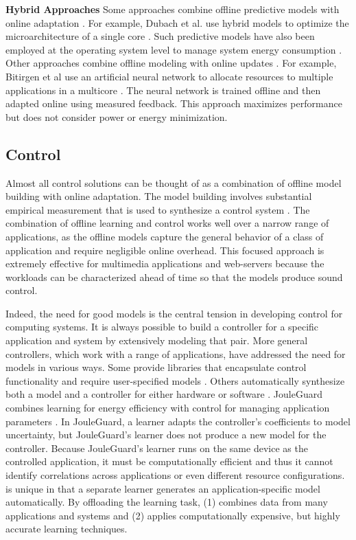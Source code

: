 \noindent \textbf{Hybrid Approaches} Some approaches combine offline
predictive models with online adaptation
\cite{Zhang2012,packandcap,Winter2010,dubach2010,Koala,Cinder,
  wu2012inferred}.  For example, Dubach et al.  use hybrid models to
optimize the microarchitecture of a single core \cite{dubach2010}.
Such predictive models have also been employed at the operating system
level to manage system energy consumption
\cite{Koala,Cinder,wu2012inferred}.  Other approaches combine offline
modeling with online updates \cite{JouleGuard,Bitirgen2008,Ipek}.  For
example, Bitirgen et al use an artificial neural network to allocate
resources to multiple applications in a multicore \cite{Bitirgen2008}.
The neural network is trained offline and then adapted online using
measured feedback.  This approach maximizes performance but does not
consider power or energy minimization.

\subsection{Control}
Almost all control solutions can be thought of as a combination of
offline model building with online adaptation.  The model building
involves substantial empirical measurement that is used to synthesize
a control system
\cite{Wu2004,TCST,Chen2011,PTRADE,POET,ControlWare,Agilos,Rajkumar,Sojka,Raghavendra2008}.
The combination of offline learning and control works well over a
narrow range of applications, as the offline models capture the
general behavior of a class of application and require negligible
online overhead.  This focused approach is extremely effective for
multimedia applications \cite{grace2,flinn99,flinn2004,xtune,TCST} and
web-servers \cite{Horvarth,LuEtAl-2006a,SunDaiPan-2008a} because the
workloads can be characterized ahead of time so that the models
produce sound control.

Indeed, the need for good models is the central tension in developing
control for computing systems.  It is always possible to build a
controller for a specific application and system by extensively
modeling that pair.  More general controllers, which work with a range
of applications, have addressed the need for models in various ways.
Some provide libraries that encapsulate control functionality and
require user-specified models
\cite{ControlWare,Sojka,Rajkumar,POET,SWiFT}.  Others automatically
synthesize both a model and a controller for either hardware
\cite{josep-isca2016} or software \cite{ICSE2014,FSE2015}.  JouleGuard
combines learning for energy efficiency with control for managing
application parameters \cite{JouleGuard}.  In JouleGuard, a learner
adapts the controller's coefficients to model uncertainty, but
JouleGuard's learner does not produce a new model for the controller.
Because JouleGuard's learner runs on the same device as the controlled
application, it must be computationally efficient and thus it cannot
identify correlations across applications or even different resource
configurations.  \SYSTEM{} is unique in that a separate learner
generates an application-specific model automatically.  By offloading
the learning task, \SYSTEM{} (1) combines data from many applications
and systems and (2) applies computationally expensive, but highly
accurate learning techniques.


